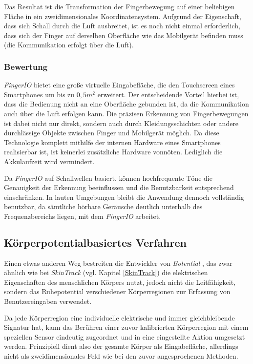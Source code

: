 Das Resultat ist die Transformation der Fingerbewegung auf einer beliebigen Fläche in ein zweidimensionales Koordinatensystem. Aufgrund der Eigenschaft, dass sich Schall durch die Luft ausbreitet, ist es noch nicht einmal erforderlich, dass sich der Finger auf derselben Oberfläche wie das Mobilgerät befinden muss (die Kommunikation erfolgt über die Luft).

\subsubsection{Bewertung}
\textit{FingerIO} bietet eine große virtuelle Eingabefläche, die den Touchscreen eines Smartphones um bis zu $0,5 m^2$  erweitert. Der entscheidende Vorteil hierbei ist, dass die Bedienung nicht an eine Oberfläche gebunden ist, da die Kommunikation auch über die Luft erfolgen kann. Die präzisen Erkennung von Fingerbewegungen ist dabei nicht nur direkt, sondern auch durch Kleidungsschichten oder andere durchlässige Objekte zwischen Finger und Mobilgerät möglich. Da diese Technologie komplett mithilfe der internen Hardware eines Smartphones realisierbar ist, ist keinerlei zusätzliche Hardware vonnöten. Lediglich die Akkulaufzeit wird vermindert.

Da \textit{FingerIO} auf Schallwellen basiert, können hochfrequente Töne die Genauigkeit der Erkennung beeinflussen und die Benutzbarkeit entsprechend einschränken. In lauten Umgebungen bleibt die Anwendung dennoch vollständig benutzbar, da sämtliche hörbare Geräusche deutlich unterhalb des Frequenzbereichs liegen, mit dem \textit{FingerIO} arbeitet.

\subsection{Körperpotentialbasiertes Verfahren}

Einen etwas anderen Weg bestreiten die Entwickler von \textit{Botential} \cite{Matthies.2015}, das zwar ähnlich wie bei \textit{SkinTrack} (vgl. Kapitel \ref{SkinTrack}) die elektrischen Eigenschaften des menschlichen Körpers nutzt, jedoch nicht die Leitfähigkeit, sondern das Ruhepotential verschiedener Körperregionen zur Erfassung von Benutzereingaben verwendet.

Da jede Körperregion eine individuelle elektrische und immer gleichbleibende Signatur hat, kann das Berühren einer zuvor kalibrierten Körperregion mit einem speziellen Sensor eindeutig zugeordnet und in eine eingestellte Aktion umgesetzt werden. Prinzipiell dient also der gesamte Körper als Eingabefläche, allerdings nicht als zweidimensionales Feld wie bei den zuvor angesprochenen Methoden.

